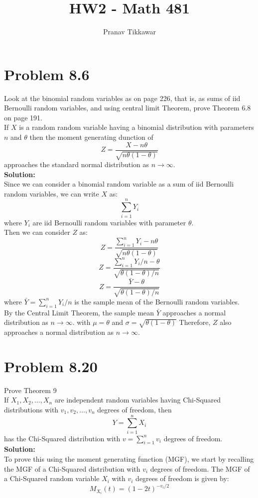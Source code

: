 \documentclass{article}
\author{Pranav Tikkawar}
\title{HW2 - Math 481}
\begin{document}
\maketitle

\section*{Problem 8.6}
Look at the binomial random variables as on page 226, that is, as sums of iid Bernoulli random variables, and using central limit Theorem, prove Theorem 6.8 on page 191.\\
If $X$ is a random random variable having a binomial distribution with parameters $n$ and $\theta$ then the moment generating dunction of 
$$ Z = \frac{X - n\theta}{\sqrt{n\theta(1-\theta)}} $$
approaches the standard normal distribution as $n \rightarrow \infty$.\\

\textbf{Solution:}\\
Since we can consider a binomial random variable as a sum of iid Bernoulli random variables, we can write $X$ as: 
$$\sum_{i=1}^{n} Y_i$$
where $Y_i$ are iid Bernoulli random variables with parameter $\theta$.\\
Then we can consider $Z$ as:
$$Z = \frac{\sum_{i=1}^{n} Y_i - n\theta}{\sqrt{n\theta(1-\theta)}}$$
$$Z = \frac{\sum_{i=1}^{n} Y_i /n - \theta}{\sqrt{\theta(1-\theta)/n}}$$
$$Z = \frac{\bar{Y} - \theta}{\sqrt{\theta(1-\theta)/n}}$$
where $\bar{Y} = \sum_{i=1}^{n} Y_i /n$ is the sample mean of the Bernoulli random variables.\\
By the Central Limit Theorem, the sample mean $\bar{Y}$ approaches a normal distribution as $n \rightarrow \infty$. with $\mu = \theta$ and $\sigma = \sqrt{\theta(1-\theta)}$ Therefore, $Z$ also approaches a normal distribution as $n \rightarrow \infty$.\\


\section*{Problem 8.20}
Prove Theorem 9\\
If $X_1, X_2, \ldots, X_n$ are independent random variables having Chi-Squared distributions with $v_1, v_2, \ldots, v_n$ degrees of freedom, then 
$$ Y = \sum_{i=1}^{n} X_i $$
has the Chi-Squared distribution with $v = \sum_{i=1}^{n} v_i$ degrees of freedom.\\
\textbf{Solution:}\\
To prove this using the moment generating function (MGF), we start by recalling the MGF of a Chi-Squared distribution with \( v_i \) degrees of freedom. The MGF of a Chi-Squared random variable \( X_i \) with \( v_i \) degrees of freedom is given by:
\[ M_{X_i}(t) = (1 - 2t)^{-v_i/2} \]
\end{document}
